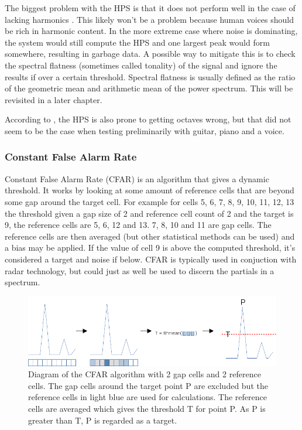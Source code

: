 The biggest problem with the HPS is that it does not perform well in the case of lacking harmonics \cite{McLeod2008}. This likely won't be a problem because human voices should be rich in harmonic content. In the more extreme case where noise is dominating, the system would still compute the HPS and one largest peak would form somewhere, resulting in garbage data. A possible way to mitigate this is to check the spectral flatness (sometimes called tonality) of the signal and ignore the results if over a certain threshold. Spectral flatness is usually defined as the ratio of the geometric mean and arithmetic mean of the power spectrum. This will be revisited in a later chapter.

According to \cite{Smyth2019}, the HPS is also prone to getting octaves wrong, but that did not seem to be the case when testing preliminarily with guitar, piano and a voice.

\subsubsection{Constant False Alarm Rate}
Constant False Alarm Rate (CFAR) is an algorithm that gives a dynamic threshold. It works by looking at some amount of reference cells that are beyond some gap around the target cell. For example for cells 5, 6, 7, 8, 9, 10, 11, 12, 13 the threshold given a gap size of 2 and reference cell count of 2 and the target is 9, the reference cells are 5, 6, 12 and 13. 7, 8, 10 and 11 are gap cells. The reference cells are then averaged (but other statistical methods can be used) and a bias may be applied. If the value of cell 9 is above the computed threshold, it's considered a target and noise if below. CFAR is typically used in conjuction with radar technology, but could just as well be used to discern the partials in a spectrum. 

\begin{figure}[ht]
    \centering
    \includegraphics[width=\textwidth]{./images/cfar.png}
    \caption{Diagram of the CFAR algorithm with 2 gap cells and 2 reference cells. The gap cells around the target point P are excluded but the reference cells in light blue are used for calculations. The reference cells are averaged which gives the threshold T for point P. As P is greater than T, P is regarded as a target.\label{fig:cfar}}
\end{figure}

